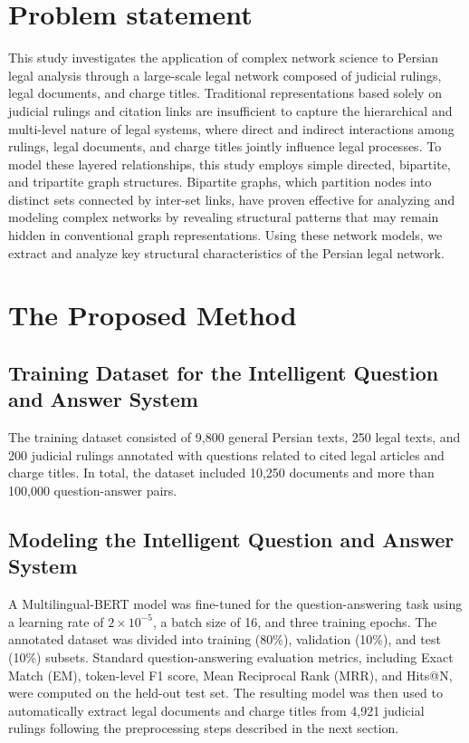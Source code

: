 \documentclass[twoside]{article}
\begin{document}
\section{	Problem statement   }
This study investigates the application of complex network science to Persian legal analysis through a large-scale legal network composed of judicial rulings, legal documents, and charge titles. Traditional representations based solely on judicial rulings and citation links are insufficient to capture the hierarchical and multi-level nature of legal systems, where direct and indirect interactions among rulings, legal documents, and charge titles jointly influence legal processes. To model these layered relationships, this study employs simple directed, bipartite, and tripartite graph structures. Bipartite graphs, which partition nodes into distinct sets connected by inter-set links, have proven effective for analyzing \citep{Siqueira:2026,Ahn:2011,Tumminello:2011} and modeling \citep{Siqueira:2026,Gong:Luo:2025,Tarissan:2013,Guillaume:Latapy:2004} complex networks by revealing structural patterns that may remain hidden in conventional graph representations. Using these network models, we extract and analyze key structural characteristics of the Persian legal network.

\section{	The Proposed Method }

\subsection{ Training Dataset for the Intelligent Question and Answer System}
The training dataset consisted of 9,800 general Persian texts, 250 legal texts, and 200 judicial rulings annotated with questions related to cited legal articles and charge titles. In total, the dataset included 10,250 documents and more than 100,000 question-answer pairs.

\subsection{Modeling the Intelligent Question and Answer System}
A Multilingual-BERT model was fine-tuned for the question-answering task using a learning rate of $2\times 10^{-5}$, a batch size of 16, and three training epochs. The annotated dataset was divided into training (80\%), validation (10\%), and test (10\%) subsets. Standard question-answering evaluation metrics, including Exact Match (EM), token-level F1 score, Mean Reciprocal Rank (MRR), and Hits@N, were computed on the held-out test set. The resulting model was then used to automatically extract legal documents and charge titles from 4,921 judicial rulings following the preprocessing steps described in the next section.
\end{document}
